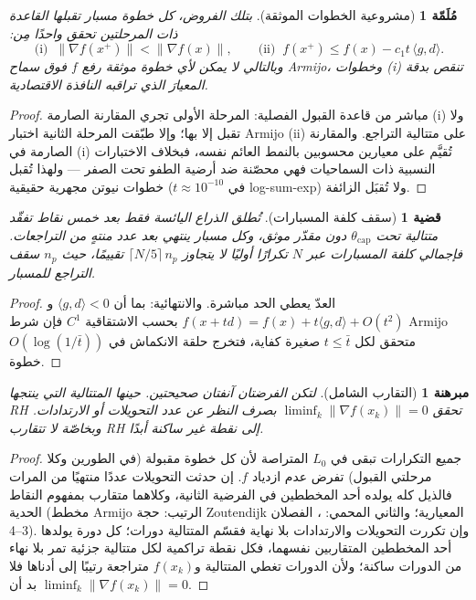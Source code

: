 ﻿\documentclass[12pt]{article}
\newtheorem{theorem}{مبرهنة}
\newtheorem{lemma}{مُلَمّة}
\newtheorem{proposition}{قضية}
\begin{document}
\begin{lemma}[مشروعية الخطوات الموثقة]\label{lem:adm-ar}
بتلك الفروض، كل خطوة مسبار تقبلها القاعدة ذات المرحلتين تحقق واحدًا
مِن:
\begin{equation}
\text{(i)}\;\; \|\nabla f(x^+)\| < \|\nabla f(x)\|,
\qquad
\text{(ii)}\;\; f(x^+) \le f(x) - c_1 t\,\langle g,d\rangle .
\end{equation}
وبالتالي لا يمكن لأي خطوة موثقة رفع $f$ فوق سماح Armijo، وخطوات
(i) تنقص بدقة المعيارَ الذي تراقبه النافذة الاقتصادية.
\end{lemma}
\begin{proof}
مباشر من قاعدة القبول الفصلية: المرحلة الأولى تجري المقارنة الصارمة
(i) ولا تقبل إلا بها؛ وإلا طبّقت المرحلة الثانية اختبار Armijo (ii)
على متتالية التراجع. والمقارنة الصارمة في (i) تُقيَّم على معيارين
محسوبين بالنمط العائم نفسه، فبخلاف الاختبارات النسبية ذات السماحيات
فهي محصّنة ضد أرضية الطفو تحت الصفر --- ولهذا تُقبل خطوات نيوتن مجهرية
حقيقية ($t\approx10^{-10}$ في log-sum-exp) ولا تُقبَل الزائفة.
\end{proof}

\begin{proposition}[سقف كلفة المسبارات]
تُطلق الذراع اليائسة فقط بعد خمس نقاط تفقّد متتالية تحت
$\theta_{\mathrm{cap}}$ دون مقدّر موثق، وكل مسبار ينتهي بعد عدد منتهٍ
من التراجعات. فإجمالي كلفة المسبارات عبر $N$ تكرارًا أوليًا لا يتجاوز
$\lceil N/5\rceil\, n_p$ تقييمًا، حيث $n_p$ سقف التراجع للمسبار.
\end{proposition}
\begin{proof}
العدّ يعطي الحد مباشرة. والانتهائية: بما أن $\langle g,d\rangle<0$
و$f(x+td)=f(x)+t\langle g,d\rangle+O(t^2)$ بحسب الاشتقاقية $C^1$ فإن
شرط Armijo متحقق لكل $t\le\bar t$ صغيرة كفاية، فتخرج حلقة الانكماش في
$O(\log(1/\bar t))$ خطوة.
\end{proof}

\begin{theorem}[التقارب الشامل]
لتكن الفرضتان آنفتان صحيحتين. حينها المتتالية التي ينتجها RH تحقق
$\liminf_k \|\nabla f(x_k)\| = 0$ بصرف النظر عن عدد التحويلات أو
الارتدادات. وبخاصّة لا تتقارب RH إلى نقطة غير ساكنة أبدًا.
\end{theorem}
\begin{proof}
جميع التكرارات تبقى في $L_0$ المتراصة لأن كل خطوة مقبولة (في
الطورين وكلا مرحلتي القبول) تفرض عدم ازدياد $f$. إن حدثت التحويلات عددًا
منتهيًا من المرات فالذيل كله يولده أحد المخططين في الفرضية الثانية،
وكلاهما متقارب بمفهوم النقاط الحدية (مخطط Armijo الرتيب: حجة
Zoutendijk المعيارية؛ والثاني المحمي: \cite{nw}، الفصلان 3--4). وإن
تكررت التحويلات والارتدادات بلا نهاية فقسّم المتتالية دورات؛ كل دورة
يولدها أحد المخططين المتقاربين نفسهما، فكل نقطة تراكمية لكل متتالية جزئية
تمر بلا نهاء من الدورات ساكنة؛ ولأن الدورات تغطي المتتالية و$f(x_k)$
متراجعة رتيبًا إلى أدناها فلا بد أن
$\liminf_k\|\nabla f(x_k)\|=0$.
\end{proof}
\end{document}
